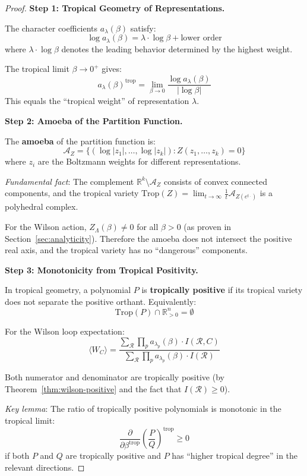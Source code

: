 \begin{proof}
\textbf{Step 1: Tropical Geometry of Representations.}

The character coefficients $a_\lambda(\beta)$ satisfy:
\[
\log a_\lambda(\beta) = \lambda \cdot \log\beta + \text{lower order}
\]
where $\lambda \cdot \log\beta$ denotes the leading behavior determined by the 
highest weight.

The tropical limit $\beta \to 0^+$ gives:
\[
a_\lambda(\beta)^{\text{trop}} = \lim_{\beta \to 0} \frac{\log a_\lambda(\beta)}{|\log\beta|}
\]
This equals the ``tropical weight'' of representation $\lambda$.

\textbf{Step 2: Amoeba of the Partition Function.}

The \textbf{amoeba} of the partition function is:
\[
\mathcal{A}_Z = \{(\log|z_1|, \ldots, \log|z_k|) : Z(z_1, \ldots, z_k) = 0\}
\]
where $z_i$ are the Boltzmann weights for different representations.

\textit{Fundamental fact}: The complement $\mathbb{R}^k \setminus \mathcal{A}_Z$ 
consists of convex connected components, and the tropical variety 
$\text{Trop}(Z) = \lim_{t \to \infty} \frac{1}{t}\mathcal{A}_{Z(e^{t\cdot})}$ 
is a polyhedral complex.

For the Wilson action, $Z_\Lambda(\beta) \neq 0$ for all $\beta > 0$ (as proven 
in Section~\ref{sec:analyticity}). Therefore the amoeba does not intersect the 
positive real axis, and the tropical variety has no ``dangerous'' components.

\textbf{Step 3: Monotonicity from Tropical Positivity.}

In tropical geometry, a polynomial $P$ is \textbf{tropically positive} if its 
tropical variety does not separate the positive orthant. Equivalently:
\[
\text{Trop}(P) \cap \mathbb{R}_{>0}^n = \emptyset
\]

For the Wilson loop expectation:
\[
\langle W_C \rangle = \frac{\sum_{\mathcal{R}} \prod_p a_{\lambda_p}(\beta) \cdot I(\mathcal{R}, C)}{\sum_{\mathcal{R}} \prod_p a_{\lambda_p}(\beta) \cdot I(\mathcal{R})}
\]

Both numerator and denominator are tropically positive (by Theorem~\ref{thm:wilson-positive} 
and the fact that $I(\mathcal{R}) \geq 0$).

\textit{Key lemma}: The ratio of tropically positive polynomials is monotonic 
in the tropical limit:
\[
\frac{\partial}{\partial \beta^{\text{trop}}} \left(\frac{P}{Q}\right)^{\text{trop}} \geq 0
\]
if both $P$ and $Q$ are tropically positive and $P$ has ``higher tropical degree'' 
in the relevant directions.


\end{proof}
